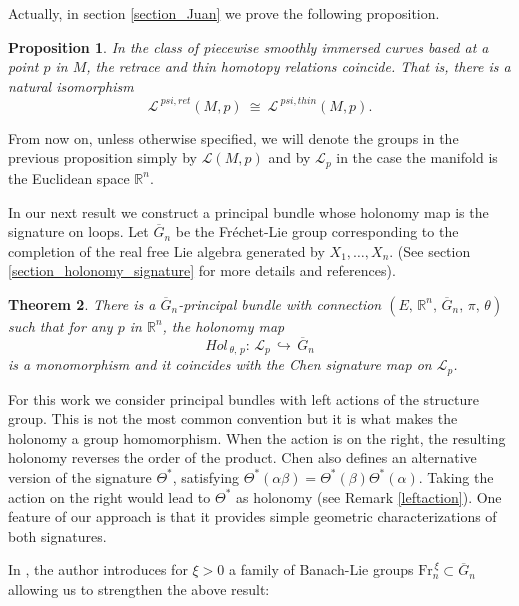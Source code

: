 \documentclass{amsart}
\newcommand{\R}{{\mathbb R}}
\newtheorem{theorem}{Theorem}[section]
\newtheorem{proposition}[theorem]{Proposition}
\begin{document}
 Actually, in section \ref{section_Juan} we prove the following proposition.

\begin{proposition}\label{Equivalencia_ret_thin}
In the class of piecewise smoothly immersed curves based at a point $p$ in $M$, the retrace and thin homotopy relations coincide. That is, there is a natural isomorphism
$$\mathcal{L}^{\ psi,ret}(M,p)\ \cong\ \mathcal{L}^{\ psi,thin}(M,p).$$
\end{proposition}

From now on, unless otherwise specified, we will denote the groups in the previous proposition simply by $\mathcal{L}(M, p)$ and by $\mathcal{L}_p$ in the case the manifold is the Euclidean space $\R^n$. 


In our next result we construct a principal bundle whose holonomy map is the signature on loops. 
Let $\overline{G}_n$ be the Fréchet-Lie group corresponding to the completion of the real free Lie algebra generated by $X_1,\ldots, X_n$. (See section \ref{section_holonomy_signature} for more details and references). 
\begin{theorem}\label{main}
There is a $\overline{G}_n$-principal bundle with connection $(E,\,\R^n,\,\overline{G}_n,\,\pi,\,\theta)$ such that for any $p$ in $\R^n$, the holonomy map 
$$Hol_{\,\theta,\,p}:\,\mathcal{L}_p\,\hookrightarrow\,\overline{G}_n$$
is a monomorphism	 and it coincides with the Chen signature map  on $\mathcal{L}_p$. 
\end{theorem}

For this work we consider principal bundles with left actions of the structure group. This  is not the most common convention but it is what makes the holonomy a group homomorphism. When the action is on the right, the resulting holonomy reverses the order of the product.   Chen \cite{Chen2prima} also defines an alternative version of the signature $\Theta^{*}$, satisfying    
$\Theta^{*}(\alpha\beta)=\Theta^{*}(\beta)\Theta^{*}(\alpha)$. Taking the action on the right would lead to $\Theta^{*}$ as holonomy (see Remark \ref{leftaction}).  
One feature of our approach is that it provides simple geometric  characterizations of both signatures. 




In \cite{Neretin}, the author introduces for $\xi>0$ a family of Banach-Lie groups $\mbox{Fr}_n^{\,\xi}\subset \overline{G}_n$ allowing us to  strengthen  the above result:
\end{document}
